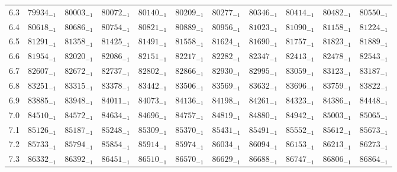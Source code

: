 \documentclass[10pt, a4paper]{article}
\begin{document}
\begin{center}
\begin{longtable}{c || c c c c c | c c c c c}
        6.3 & \({79934}_{-1}\) & \({80003}_{-1}\) & \({80072}_{-1}\) & \({80140}_{-1}\) & \({80209}_{-1}\) & \({80277}_{-1}\) & \({80346}_{-1}\) & \({80414}_{-1}\) & \({80482}_{-1}\) & \({80550}_{-1}\)\\
        6.4 & \({80618}_{-1}\) & \({80686}_{-1}\) & \({80754}_{-1}\) & \({80821}_{-1}\) & \({80889}_{-1}\) & \({80956}_{-1}\) & \({81023}_{-1}\) & \({81090}_{-1}\) & \({81158}_{-1}\) & \({81224}_{-1}\)\\
        6.5 & \({81291}_{-1}\) & \({81358}_{-1}\) & \({81425}_{-1}\) & \({81491}_{-1}\) & \({81558}_{-1}\) & \({81624}_{-1}\) & \({81690}_{-1}\) & \({81757}_{-1}\) & \({81823}_{-1}\) & \({81889}_{-1}\)\\
        6.6 & \({81954}_{-1}\) & \({82020}_{-1}\) & \({82086}_{-1}\) & \({82151}_{-1}\) & \({82217}_{-1}\) & \({82282}_{-1}\) & \({82347}_{-1}\) & \({82413}_{-1}\) & \({82478}_{-1}\) & \({82543}_{-1}\)\\
        6.7 & \({82607}_{-1}\) & \({82672}_{-1}\) & \({82737}_{-1}\) & \({82802}_{-1}\) & \({82866}_{-1}\) & \({82930}_{-1}\) & \({82995}_{-1}\) & \({83059}_{-1}\) & \({83123}_{-1}\) & \({83187}_{-1}\)\\
        6.8 & \({83251}_{-1}\) & \({83315}_{-1}\) & \({83378}_{-1}\) & \({83442}_{-1}\) & \({83506}_{-1}\) & \({83569}_{-1}\) & \({83632}_{-1}\) & \({83696}_{-1}\) & \({83759}_{-1}\) & \({83822}_{-1}\)\\
        6.9 & \({83885}_{-1}\) & \({83948}_{-1}\) & \({84011}_{-1}\) & \({84073}_{-1}\) & \({84136}_{-1}\) & \({84198}_{-1}\) & \({84261}_{-1}\) & \({84323}_{-1}\) & \({84386}_{-1}\) & \({84448}_{-1}\)\\
        \hline
        7.0 & \({84510}_{-1}\) & \({84572}_{-1}\) & \({84634}_{-1}\) & \({84696}_{-1}\) & \({84757}_{-1}\) & \({84819}_{-1}\) & \({84880}_{-1}\) & \({84942}_{-1}\) & \({85003}_{-1}\) & \({85065}_{-1}\)\\
        7.1 & \({85126}_{-1}\) & \({85187}_{-1}\) & \({85248}_{-1}\) & \({85309}_{-1}\) & \({85370}_{-1}\) & \({85431}_{-1}\) & \({85491}_{-1}\) & \({85552}_{-1}\) & \({85612}_{-1}\) & \({85673}_{-1}\)\\
        7.2 & \({85733}_{-1}\) & \({85794}_{-1}\) & \({85854}_{-1}\) & \({85914}_{-1}\) & \({85974}_{-1}\) & \({86034}_{-1}\) & \({86094}_{-1}\) & \({86153}_{-1}\) & \({86213}_{-1}\) & \({86273}_{-1}\)\\
        7.3 & \({86332}_{-1}\) & \({86392}_{-1}\) & \({86451}_{-1}\) & \({86510}_{-1}\) & \({86570}_{-1}\) & \({86629}_{-1}\) & \({86688}_{-1}\) & \({86747}_{-1}\) & \({86806}_{-1}\) & \({86864}_{-1}\)\\

\end{longtable}
\end{center}
\end{document}
